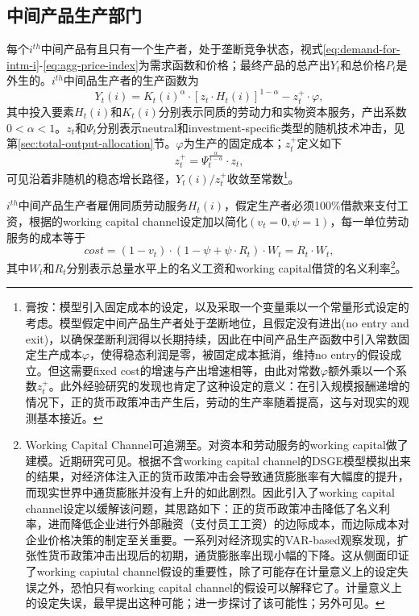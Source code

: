 \subsection{中间产品生产部门}
\label{sec:intm-production-sector}
每个$i^{th}$中间产品有且只有一个生产者，处于垄断竞争状态，视式\eqref{eq:demand-for-intm-i}-\eqref{eq:agg-price-index}为需求函数和价格；最终产品的总产出$Y_t$和总价格$P_t$是外生的。$i^{th}$中间品生产者的生产函数为
\begin{equation}
  \label{eq:intm-prodc-func-me}
  Y_t(i) = K_t(i)^{\alpha} \cdot \left[ z_t \cdot H_{t}(i) \right]^{1-\alpha}  - z_t^+ \cdot \varphi,
\end{equation}
其中投入要素$H_t(i)$和$K_{t}(i)$分别表示同质的劳动力和实物资本服务，产出系数$0<\alpha<1$。$z_t$和$\Psi_t$分别表示neutral和investment-specific类型的随机技术冲击，见第\ref{sec:total-output-allocation}节。$\varphi$为生产的固定成本；$z_t^+$定义如下
\begin{equation}
  \label{eq:ztplus-zt-Psi}
  z_t^+ = \Psi_t^{\frac{\alpha}{1-\alpha}} \cdot z_t,
\end{equation}
可见沿着非随机的稳态增长路径，$Y_{t}(i)/z_t^+$收敛至常数\footnote{膏按：模型引入固定成本的设定，以及采取一个变量乘以一个常量形式设定的考虑。模型假定中间产品生产者处于垄断地位，且假定没有进出(no entry and exit)，以确保垄断利润得以长期持续，因此在中间产品生产函数中引入常数固定生产成本$\varphi$，使得稳态利润是零，被固定成本抵消，维持no entry的假设成立。但这需要fixed cost的增速与产出增速相等，由此对常数$\varphi$额外乘以一个系数$z_t^+$。此外经验研究的发现也肯定了这种设定的意义：在引入规模报酬递增的情况下，正的货币政策冲击产生后，劳动的生产率随着提高，这与对现实的观测基本接近。}。

$i^{th}$中间产品生产者雇佣同质劳动服务$H_{t}(i)$，假定生产者必须100\%借款来支付工资，根据\cite{Christiano:2005ib}的working capital channel设定加以简化$(v_t = 0, \psi = 1)$，每一单位劳动服务的成本等于
\begin{equation*}
  cost = (1-v_t) \cdot (1-\psi + \psi \cdot R_t) \cdot W_t = R_t \cdot W_t,
\end{equation*}
其中$W_t$和$R_t$分别表示总量水平上的名义工资和working capital借贷的名义利率\footnote{Working Capital Channel可追溯至\cite{Basu:1995vl}。\cite{Christiano:2005ib}对资本和劳动服务的working capital做了建模。近期研究可见\cite{Phaneuf:2015vp}。根据不含working capital channel的DSGE模型模拟出来的结果，对经济体注入正的货币政策冲击会导致通货膨胀率有大幅度的提升，而现实世界中通货膨胀并没有上升的如此剧烈。\cite{Christiano:2005ib}因此引入了working capital channel设定以缓解该问题，其思路如下：正的货币政策冲击降低了名义利率，进而降低企业进行外部融资（支付员工工资）的边际成本，而边际成本对企业价格决策的制定至关重要。一系列对经济现实的VAR-based观察发现，扩张性货币政策冲击出现后的初期，通货膨胀率出现小幅的下降。这从侧面印证了working capiutal channel假设的重要性，除了可能存在计量意义上的设定失误之外，恐怕只有working capital channel的假设可以解释它了。计量意义上的设定失误，\cite{Sims:1992bw}最早提出这种可能；\cite{Christiano:1999uw}进一步探讨了该可能性；另外可见\cite{Bernanke:2005vn}。}。



